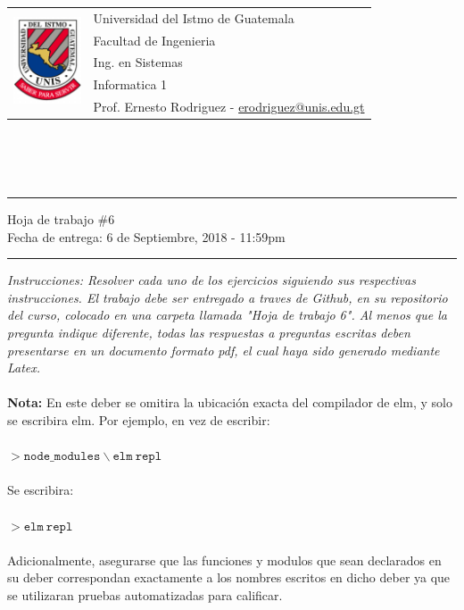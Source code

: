 \documentclass{article}
\newcommand{\horrule}[1]{\rule{\linewidth}{#1}}
\begin{document}
\begin{tabular}{l l}
\multirow{5}{*}{\includegraphics[width=2cm]{../../recursos/logo.png}}
 & Universidad del Istmo de Guatemala \\
 & Facultad de Ingenieria \\
 & Ing. en Sistemas \\
 & Informatica 1 \\
 & Prof. Ernesto Rodriguez - \href{mailto:erodriguez@unis.edu.gt}{erodriguez@unis.edu.gt} \\
\end{tabular}
\\\\\\

\begin{center}
        \horrule{0.5pt}
        \huge{Hoja de trabajo \#6} \\
        \large{Fecha de entrega: 6 de Septiembre, 2018 - 11:59pm} \\
        \horrule{1pt}
\end{center}

\emph{Instrucciones: Resolver cada uno de los ejercicios siguiendo sus respectivas
instrucciones. El trabajo debe ser entregado a traves de Github, en su repositorio del curso, colocado en una
carpeta llamada "Hoja de trabajo 6". Al menos que la pregunta indique diferente, todas las
respuestas a preguntas escritas deben presentarse en un documento formato pdf, el cual
haya sido generado mediante Latex. }\\\\

{\bf Nota: }En este deber se omitira la ubicaci\'on exacta del compilador
de elm, y solo se escribira elm. Por ejemplo, en vez de escribir:\\\\
$>\mathtt{node\_modules}\backslash\mathtt{elm\ repl}$\\\\
Se escribira:\\\\
$>\mathtt{elm\ repl}$\\\\
Adicionalmente, asegurarse que las funciones y modulos que sean declarados
en su deber correspondan exactamente a los nombres escritos en dicho deber
ya que se utilizaran pruebas automatizadas para calificar.
\end{document}
